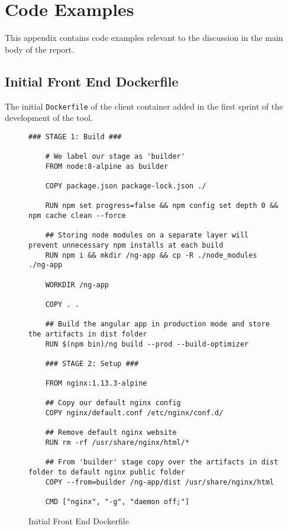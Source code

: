 \chapter{Code Examples}
\label{chap:codesamples}

This appendix contains code examples relevant to the discussion in the main body of the
report.

\newpage
\section{Initial Front End Dockerfile}
The initial \texttt{Dockerfile} of the client container added in the first sprint of
the development of the tool.

\begin{figure}[ht]
  \begin{lstlisting}[basicstyle=\small, breaklines=true]
    ### STAGE 1: Build ###

    # We label our stage as 'builder'
    FROM node:8-alpine as builder

    COPY package.json package-lock.json ./

    RUN npm set progress=false && npm config set depth 0 && npm cache clean --force

    ## Storing node modules on a separate layer will prevent unnecessary npm installs at each build
    RUN npm i && mkdir /ng-app && cp -R ./node_modules ./ng-app

    WORKDIR /ng-app

    COPY . .

    ## Build the angular app in production mode and store the artifacts in dist folder
    RUN $(npm bin)/ng build --prod --build-optimizer

    ### STAGE 2: Setup ###

    FROM nginx:1.13.3-alpine

    ## Copy our default nginx config
    COPY nginx/default.conf /etc/nginx/conf.d/

    ## Remove default nginx website
    RUN rm -rf /usr/share/nginx/html/*

    ## From 'builder' stage copy over the artifacts in dist folder to default nginx public folder
    COPY --from=builder /ng-app/dist /usr/share/nginx/html

    CMD ["nginx", "-g", "daemon off;"]
  \end{lstlisting}
  \caption{Initial Front End Dockerfile}
  \label{sample:clientdocker}
\end{figure}

